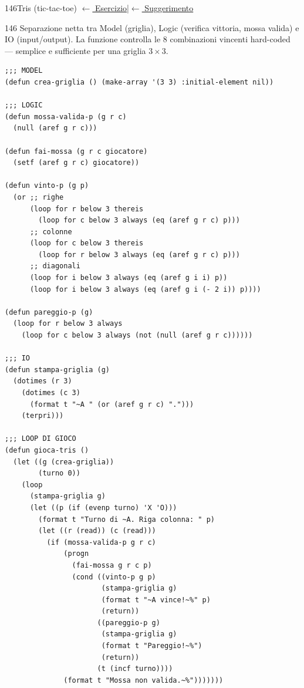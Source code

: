 \label{sol:146}
\begin{solbox}{146}{Tris (tic-tac-toe)}
\small\color{black!55}\hyperref[ex:146]{$\leftarrow$ Esercizio}\enspace\textcolor{black!30}{|}\enspace\hyperref[hint:146]{$\leftarrow$ Suggerimento}\normalsize\color{black}
\begin{ragionamentoBox}{146}
Separazione netta tra Model (griglia), Logic (verifica vittoria,
mossa valida) e IO (input/output). La funzione 
controlla le 8 combinazioni vincenti hard-coded
--- semplice e sufficiente per una griglia $3\times3$.
\end{ragionamentoBox}
\begin{lstlisting}
;;; MODEL
(defun crea-griglia () (make-array '(3 3) :initial-element nil))

;;; LOGIC
(defun mossa-valida-p (g r c)
  (null (aref g r c)))

(defun fai-mossa (g r c giocatore)
  (setf (aref g r c) giocatore))

(defun vinto-p (g p)
  (or ;; righe
      (loop for r below 3 thereis
        (loop for c below 3 always (eq (aref g r c) p)))
      ;; colonne
      (loop for c below 3 thereis
        (loop for r below 3 always (eq (aref g r c) p)))
      ;; diagonali
      (loop for i below 3 always (eq (aref g i i) p))
      (loop for i below 3 always (eq (aref g i (- 2 i)) p))))

(defun pareggio-p (g)
  (loop for r below 3 always
    (loop for c below 3 always (not (null (aref g r c))))))

;;; IO
(defun stampa-griglia (g)
  (dotimes (r 3)
    (dotimes (c 3)
      (format t "~A " (or (aref g r c) ".")))
    (terpri)))

;;; LOOP DI GIOCO
(defun gioca-tris ()
  (let ((g (crea-griglia))
        (turno 0))
    (loop
      (stampa-griglia g)
      (let ((p (if (evenp turno) 'X 'O)))
        (format t "Turno di ~A. Riga colonna: " p)
        (let ((r (read)) (c (read)))
          (if (mossa-valida-p g r c)
              (progn
                (fai-mossa g r c p)
                (cond ((vinto-p g p)
                       (stampa-griglia g)
                       (format t "~A vince!~%" p)
                       (return))
                      ((pareggio-p g)
                       (stampa-griglia g)
                       (format t "Pareggio!~%")
                       (return))
                      (t (incf turno))))
              (format t "Mossa non valida.~%")))))))
\end{lstlisting}
\end{solbox}

